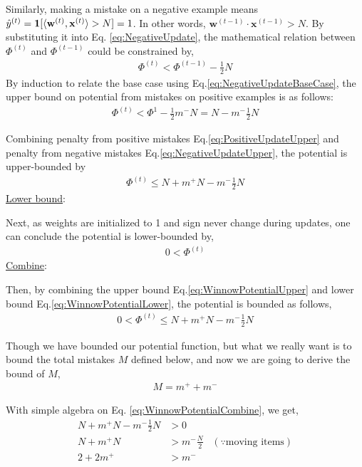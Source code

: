 \documentclass[11pt]{article}
\begin{document}
{Similarly, making a mistake on a negative example means 
 $\hat{y}^{(t)}=\textbf{1}[\langle \textbf w^{(t)}, \textbf x^{(t)}\rangle>N]=1$. In other words, $\textbf{w}^{(t-1)}\cdot \textbf{x}^{(t-1)} > N$. By substituting it into Eq. \ref{eq:NegativeUpdate}, the mathematical relation between $\Phi^{(t)}$ and $\Phi^{(t-1)}$ could be constrained by, 
\begin{align}
    \Phi^{(t)} < \Phi^{(t-1)} -\frac{1}{2}N \label{eq:NegativeUpdateBaseCase}
\end{align}
By induction to relate the base case using Eq.\ref{eq:NegativeUpdateBaseCase}, the upper bound on potential from mistakes on positive examples is as follows:
\begin{align}
    \Phi^{(t)} < \Phi^{1} -\frac{1}{2}m^-N = N - m^-\frac{1}{2}N \label{eq:NegativeUpdateUpper}
\end{align}

Combining penalty from positive mistakes Eq.\ref{eq:PositiveUpdateUpper} and penalty from negative mistakes Eq.\ref{eq:NegativeUpdateUpper}, the potential is upper-bounded by 
\begin{align}
    \Phi^{(t)} \leq N +m^+N - m^-\frac{1}{2}N \label{eq:WinnowPotentialUpper}
\end{align}
\underline{Lower bound}:

Next, as weights are initialized to 1 and sign never change during updates, one can conclude the potential is lower-bounded by,
\begin{align}
    0 < \Phi^{(t)} \label{eq:WinnowPotentialLower}
\end{align}
\underline{Combine}:

Then, by combining the upper bound Eq.\ref{eq:WinnowPotentialUpper} and lower bound Eq.\ref{eq:WinnowPotentialLower}, the potential is bounded as follows,
\begin{align}
    0 < \Phi^{(t)} \leq N +m^+N - m^-\frac{1}{2}N
    \label{eq:WinnowPotentialCombine}
\end{align}

Though we have bounded our potential function, but what we really want is to bound the total mistakes $M$ defined below, and now we are going to derive the bound of $M$,
\begin{align}
    M = m^+ + m^-
\end{align}

With simple algebra on Eq. \ref{eq:WinnowPotentialCombine}, we get, 
\begin{align}
    N+m^{+} N-m^{-} \frac{1}{2} N &> 0 \nonumber\\
    N+m^{+} N &> m^{-} \frac{N}{2} \;\;\;(\because \text{moving items}) \nonumber \\
    2+2 m^{+} &> m^{-}
    \label{eq:34}
\end{align}

}
\end{document}

